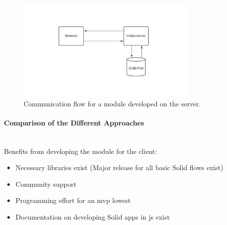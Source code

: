 \begin{figure}
    \centering
    \includegraphics[width=0.8\textwidth]{prototype/graphs/poc-infrastructure-backend.jpeg}
    \caption{Communication flow for a module developed on the server.}
    \label{fig:poc-infrastructure-backend}
\end{figure}
\vspace{0.5cm}
\paragraph{Comparison of the Different Approaches}\mbox{}\\

Benefits from developing the module for the client:

\begin{itemize}
    \item Necessary libraries exist (Major release for all basic Solid flows exist)
    \item Community support
    \item Programming effort for an \gls{mvp} lowest
    \item Documentation on developing Solid apps in \gls{js} exist
\end{itemize}

